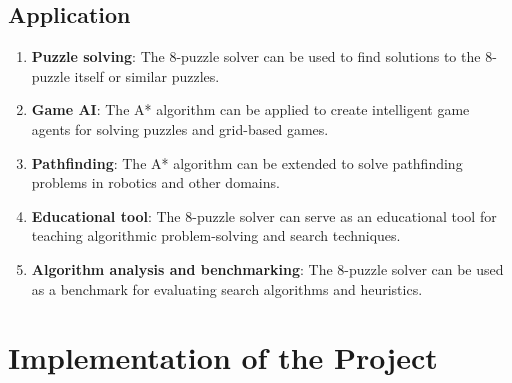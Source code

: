 \documentclass[12pt]{report}
\begin{document}
\section{Application}
\begin{enumerate}
  \item \textbf{Puzzle solving}: The 8-puzzle solver can be used to find solutions to the 8-puzzle itself or similar puzzles.
  
  \item \textbf{Game AI}: The A* algorithm can be applied to create intelligent game agents for solving puzzles and grid-based games.
  
  \item \textbf{Pathfinding}: The A* algorithm can be extended to solve pathfinding problems in robotics and other domains.
  
  \item \textbf{Educational tool}: The 8-puzzle solver can serve as an educational tool for teaching algorithmic problem-solving and search techniques.
  
  \item \textbf{Algorithm analysis and benchmarking}: The 8-puzzle solver can be used as a benchmark for evaluating search algorithms and heuristics.
\end{enumerate}




\newpage
\chapter{Implementation of the Project}
\end{document}
